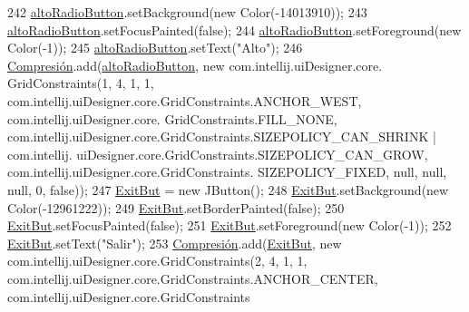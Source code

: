 \begin{DoxyCode}
242         \hyperlink{classpresentacion_1_1form_1_1PopUp__Comp_a9f49f4c6ce6d4f60a7015d8699aef151}{altoRadioButton}.setBackground(\textcolor{keyword}{new} Color(-14013910));
243         \hyperlink{classpresentacion_1_1form_1_1PopUp__Comp_a9f49f4c6ce6d4f60a7015d8699aef151}{altoRadioButton}.setFocusPainted(\textcolor{keyword}{false});
244         \hyperlink{classpresentacion_1_1form_1_1PopUp__Comp_a9f49f4c6ce6d4f60a7015d8699aef151}{altoRadioButton}.setForeground(\textcolor{keyword}{new} Color(-1));
245         \hyperlink{classpresentacion_1_1form_1_1PopUp__Comp_a9f49f4c6ce6d4f60a7015d8699aef151}{altoRadioButton}.setText(\textcolor{stringliteral}{"Alto"});
246         \hyperlink{classpresentacion_1_1form_1_1PopUp__Comp_a5769b499f21466bae765c41428512966}{Compresión}.add(\hyperlink{classpresentacion_1_1form_1_1PopUp__Comp_a9f49f4c6ce6d4f60a7015d8699aef151}{altoRadioButton}, \textcolor{keyword}{new} com.intellij.uiDesigner.core.
      GridConstraints(1, 4, 1, 1, com.intellij.uiDesigner.core.GridConstraints.ANCHOR\_WEST, com.intellij.uiDesigner.core.
      GridConstraints.FILL\_NONE, com.intellij.uiDesigner.core.GridConstraints.SIZEPOLICY\_CAN\_SHRINK | com.intellij.
      uiDesigner.core.GridConstraints.SIZEPOLICY\_CAN\_GROW, com.intellij.uiDesigner.core.GridConstraints.
      SIZEPOLICY\_FIXED, null, null, null, 0, \textcolor{keyword}{false}));
247         \hyperlink{classpresentacion_1_1form_1_1PopUp__Comp_aad0de868daa06f82567784941064f12d}{ExitBut} = \textcolor{keyword}{new} JButton();
248         \hyperlink{classpresentacion_1_1form_1_1PopUp__Comp_aad0de868daa06f82567784941064f12d}{ExitBut}.setBackground(\textcolor{keyword}{new} Color(-12961222));
249         \hyperlink{classpresentacion_1_1form_1_1PopUp__Comp_aad0de868daa06f82567784941064f12d}{ExitBut}.setBorderPainted(\textcolor{keyword}{false});
250         \hyperlink{classpresentacion_1_1form_1_1PopUp__Comp_aad0de868daa06f82567784941064f12d}{ExitBut}.setFocusPainted(\textcolor{keyword}{false});
251         \hyperlink{classpresentacion_1_1form_1_1PopUp__Comp_aad0de868daa06f82567784941064f12d}{ExitBut}.setForeground(\textcolor{keyword}{new} Color(-1));
252         \hyperlink{classpresentacion_1_1form_1_1PopUp__Comp_aad0de868daa06f82567784941064f12d}{ExitBut}.setText(\textcolor{stringliteral}{"Salir"});
253         \hyperlink{classpresentacion_1_1form_1_1PopUp__Comp_a5769b499f21466bae765c41428512966}{Compresión}.add(\hyperlink{classpresentacion_1_1form_1_1PopUp__Comp_aad0de868daa06f82567784941064f12d}{ExitBut}, \textcolor{keyword}{new} com.intellij.uiDesigner.core.GridConstraints(2, 4, 1,
       1, com.intellij.uiDesigner.core.GridConstraints.ANCHOR\_CENTER, com.intellij.uiDesigner.core.GridConstraints

\end{DoxyCode}

